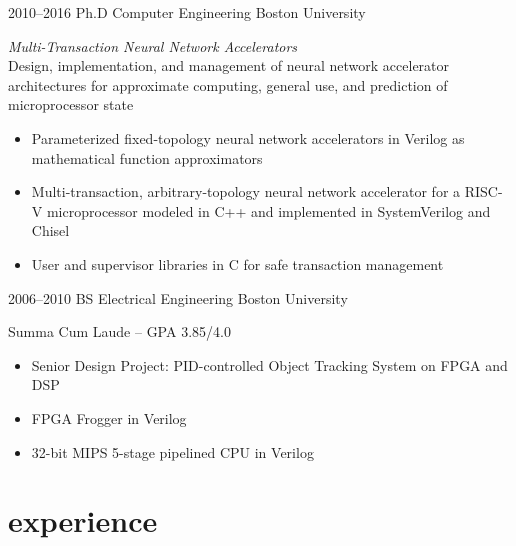\documentclass[]{friggeri-cv} %
\begin{document}
\begin{entrylist}


\entry
{2010--2016}
{Ph.D {\normalfont Computer Engineering}}
{Boston University}
{\emph{Multi-Transaction Neural Network Accelerators} \\
  Design, implementation, and management of neural network accelerator architectures for approximate computing, general use, and prediction of microprocessor state
  \begin{itemize}
  \item Parameterized fixed-topology neural network accelerators in Verilog as mathematical function approximators
  \item Multi-transaction, arbitrary-topology neural network accelerator for a RISC-V microprocessor modeled in C++ and implemented in SystemVerilog and Chisel
  \item User and supervisor libraries in C for safe transaction management
  \end{itemize}
}


\entry
{2006--2010}
{BS {\normalfont Electrical Engineering}}
{Boston University}
{Summa Cum Laude -- GPA 3.85/4.0
  \begin{itemize}
  \item Senior Design Project: PID-controlled Object Tracking System on FPGA and DSP
  \item FPGA Frogger in Verilog
  \item 32-bit MIPS 5-stage pipelined CPU in Verilog
  \end{itemize}
}


\end{entrylist}


\section{experience}

\end{document}
